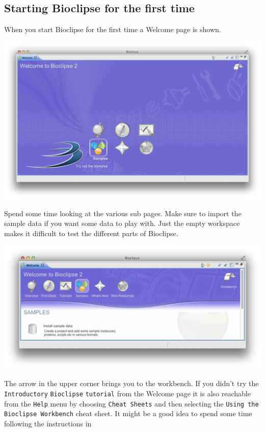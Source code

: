 \documentclass[a5paper, 10pt]{memoir}
\begin{document}
\begin{refsection}
\subsection{Starting Bioclipse for the first time}
When you start Bioclipse for the first time a Welcome page is shown.
\begin{center}
\includegraphics[width=1\textwidth]{images/WelcomePage.png}
\end{center}
Spend some time looking at the various sub pages. Make sure to import the
sample data if you want some data to play with. Just the empty workspace makes
it difficult to test the different parts of Bioclipse.
\begin{center}
\includegraphics[width=1\textwidth]{images/installSampledata.png}
\end{center}
The arrow in the upper corner brings you to the workbench. If you didn't try
the \texttt{Introductory} \texttt{Bioclipse} \texttt{tutorial} from the Welcome
page it is also reachable from the \texttt{Help} menu by choosing \texttt{Cheat
Sheets} and then selecting the \texttt{Using the Bioclipse Workbench} cheat
sheet. It might be a good idea to spend some time following the instructions in

\end{refsection}
\end{document}
